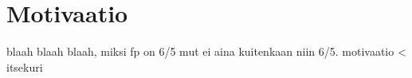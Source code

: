 \vspace{21.5pt}
\chapter{Motivaatio}

blaah blaah blaah, miksi fp on 6/5 mut ei aina kuitenkaan niin 6/5. motivaatio < itsekuri
